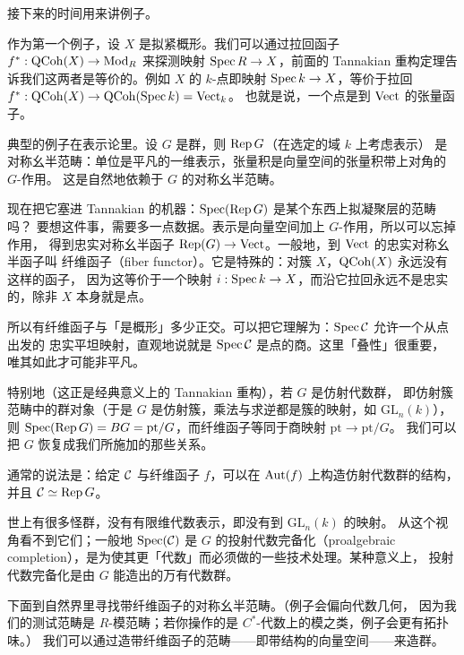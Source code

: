 接下来的时间用来讲例子。

\begin{example}
作为第一个例子，设 $X$ 是拟紧概形。我们可以通过拉回函子 $f^*:\mathrm{QCoh}(X)\to\mathrm{Mod}_R$
来探测映射 $\operatorname{Spec} R\to X$，前面的 Tannakian 重构定理告诉我们这两者是等价的。例如 $X$ 的 $k$-点即映射
$\operatorname{Spec} k\to X$，等价于拉回 $f^*:\mathrm{QCoh}(X)\to\mathrm{QCoh}(\operatorname{Spec} k)=\mathrm{Vect}_k$。
也就是说，一个点是到 $\mathrm{Vect}$ 的张量函子。
\end{example}

典型的例子在表示论里。设 $G$ 是群，则 $\operatorname{Rep} G$（在选定的域 $k$ 上考虑表示）
是对称幺半范畴：单位是平凡的一维表示，张量积是向量空间的张量积带上对角的 $G$-作用。
这是自然地依赖于 $G$ 的对称幺半范畴。

现在把它塞进 Tannakian 的机器：$\operatorname{Spec}(\operatorname{Rep} G)$ 是某个东西上拟凝聚层的范畴吗？
要想这件事，需要多一点数据。表示是向量空间加上 $G$-作用，所以可以忘掉作用，
得到忠实对称幺半函子 $\operatorname{Rep}(G)\to\mathrm{Vect}$。一般地，到 $\mathrm{Vect}$ 的忠实对称幺半函子叫
纤维函子（fiber functor）。它是特殊的：对簇 $X$，$\mathrm{QCoh}(X)$ 永远没有这样的函子，
因为这等价于一个映射 $i:\operatorname{Spec} k\to X$，而沿它拉回永远不是忠实的，除非 $X$ 本身就是点。

所以有纤维函子与「是概形」多少正交。可以把它理解为：$\operatorname{Spec}\mathcal{C}$ 允许一个从点出发的
忠实平坦映射，直观地说就是 $\operatorname{Spec}\mathcal{C}$ 是点的商。这里「叠性」很重要，
唯其如此才可能非平凡。

特别地（这正是经典意义上的 Tannakian 重构），若 $G$ 是仿射代数群，
即仿射簇范畴中的群对象（于是 $G$ 是仿射簇，乘法与求逆都是簇的映射，如 $\mathrm{GL}_n(k)$），
则 $\operatorname{Spec}(\operatorname{Rep} G)=BG=\mathrm{pt}/G$，而纤维函子等同于商映射 $\mathrm{pt}\to\mathrm{pt}/G$。
我们可以把 $G$ 恢复成我们所施加的那些关系。

通常的说法是：给定 $\mathcal{C}$ 与纤维函子 $f$，可以在 $\operatorname{Aut}(f)$ 上构造仿射代数群的结构，
并且 $\mathcal{C}\simeq\operatorname{Rep} G$。

世上有很多怪群，没有有限维代数表示，即没有到 $\mathrm{GL}_n(k)$ 的映射。
从这个视角看不到它们；一般地 $\operatorname{Spec}(\mathcal{C})$ 是 $G$ 的投射代数完备化（proalgebraic
completion），是为使其更「代数」而必须做的一些技术处理。某种意义上，
投射代数完备化是由 $G$ 能造出的万有代数群。

下面到自然界里寻找带纤维函子的对称幺半范畴。（例子会偏向代数几何，
因为我们的测试范畴是 $R$-模范畴；若你操作的是 $C^*$-代数上的模之类，例子会更有拓扑味。）
我们可以通过造带纤维函子的范畴——即带结构的向量空间——来造群。

